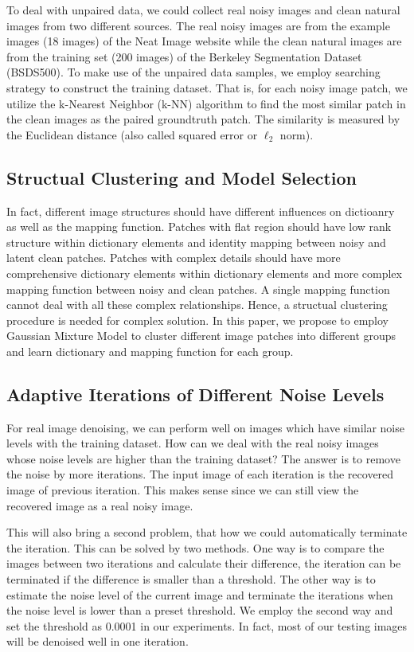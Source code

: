 \documentclass[10pt,twocolumn,letterpaper]{article}
\begin{document}
To deal with unpaired data, we could collect real noisy images and clean natural images from two different sources. The real noisy images are from the example images (18 images) of the Neat Image website while the clean natural images are from the training set (200 images) of the Berkeley Segmentation Dataset (BSDS500). To make use of the unpaired data samples, we employ searching strategy to construct the training dataset. That is, for each noisy image patch, we utilize the k-Nearest Neighbor (k-NN) algorithm to find the most similar patch in the clean images as the paired groundtruth patch. The similarity is measured by the Euclidean distance (also called squared error or $\ell_{2}$ norm).

\subsection{Structual Clustering and Model Selection}
In fact, different image structures should have different influences on dictioanry as well as the mapping function. Patches with flat region should have low rank structure within dictionary elements and identity mapping between noisy and latent clean patches. Patches with complex details should have more comprehensive dictionary elements within dictionary elements and more complex mapping function between noisy and clean patches. A single mapping function cannot deal with all these complex relationships. Hence, a structual clustering procedure is needed for complex solution. In this paper, we propose to employ Gaussian Mixture Model to cluster different image patches into different groups and learn dictionary and mapping function for each group.

\subsection{Adaptive Iterations of Different Noise Levels}
For real image denoising, we can perform well on images which have similar noise levels with the training dataset. How can we deal with the real noisy images whose noise levels are higher than the training dataset? The answer is to remove the noise by more iterations. The input image of each iteration is the recovered image of previous iteration. This makes sense since we can still view the recovered image as a real noisy image. 

This will also bring a second problem, that how we could automatically terminate the iteration. This can be solved by two methods. One way is to compare the images between two iterations and calculate their difference, the iteration can be terminated if the difference is smaller than a threshold. The other way is to estimate the noise level of the current image and terminate the iterations when the noise level is lower than a preset threshold. We employ the second way and set the threshold as 0.0001 in our experiments. In fact, most of our testing images will be denoised well in one iteration.
\end{document}

